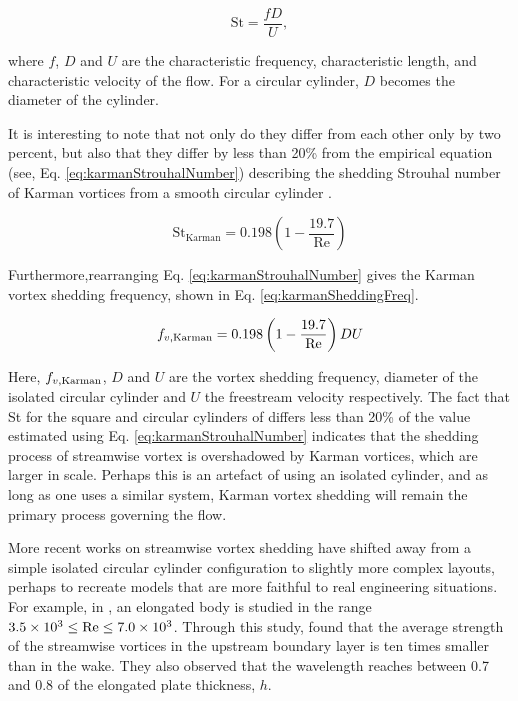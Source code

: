 \documentclass[oneside]{utmthesis}
\begin{document}
\begin{equation}
  \text{St} = \frac{f D}{U},
  \label{eq:stDef}
\end{equation}

\noindent where $f$, $D$ and $U$ are the characteristic frequency, characteristic length, and characteristic velocity of the flow. For a circular cylinder, $D$ becomes the diameter of the cylinder.

It is interesting to note that not only do they differ from each other only by two percent, but also that they differ by less than 20\% from the empirical equation (see, Eq. \ref{eq:karmanStrouhalNumber}) describing the shedding Strouhal number of Karman vortices from a smooth circular cylinder \citep{Blevins1990}.

\begin{equation}
  \text{St}_{\text{Karman}} = 0.198 \left( 1 - \frac{19.7}{\text{Re}} \right)
  \label{eq:karmanStrouhalNumber}
\end{equation}

Furthermore,rearranging Eq. \ref{eq:karmanStrouhalNumber} gives the Karman vortex shedding frequency, shown in Eq. \ref{eq:karmanSheddingFreq}.

\begin{equation}
  f_{v,\text{Karman}} = 0.198 \left( 1 - \frac{19.7}{\text{Re}} \right) DU
  \label{eq:karmanSheddingFreq}
\end{equation}

\noindent Here, $f_{v,\text{Karman}}$, $D$ and $U$ are the vortex shedding frequency, diameter of the isolated circular cylinder and $U$ the freestream velocity respectively. The fact that St for the square and circular cylinders of \citet{Agbaglah2019} differs less than 20\% of the value estimated using Eq. \ref{eq:karmanStrouhalNumber} indicates that the shedding process of streamwise vortex is overshadowed by Karman vortices, which are larger in scale. Perhaps this is an artefact of using an isolated cylinder, and as long as one uses a similar system, Karman vortex shedding will remain the primary process governing the flow.

More recent works on streamwise vortex shedding have shifted away from a simple isolated circular cylinder configuration to slightly more complex layouts, perhaps to recreate models that are more faithful to real engineering situations. For example, in \citet{Gibeau2018}, an elongated body is studied in the range $3.5 \times 10^{3} \leq \text{Re} \leq 7.0 \times 10^{3}$. Through this study, \citet{Gibeau2018} found that the average strength of the streamwise vortices in the upstream boundary layer is ten times smaller than in the wake. They also observed that the wavelength reaches between 0.7 and 0.8 of the elongated plate thickness, $h$.
\end{document}
